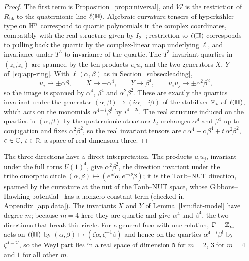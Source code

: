 \begin{proof}
The first term is Proposition~\ref{prop:universal}, and $\mathcal W$ is the restriction of $R_{\mathrm{hk}}$ to the
quaternionic line $\ell(\mathbb H)$. Algebraic curvature tensors of hyperk\"ahler type on $\mathbb H^n$
correspond to quartic polynomials in the complex coordinates, compatibly with the real structure given
by $I_2$~\cite{Alekseevsky:1968,Salamon:1982}; restriction to $\ell(\mathbb H)$ corresponds to pulling back the quartic by the
complex-linear map underlying $\ell$, and invariance under $T^3$ to invariance of the quartic. The
$T^3$-invariant quartics in $(z_i,\tilde z_i)$ are spanned by the ten products $u_iu_j$ and the two
generators $X$, $Y$ of~\eqref{eq:app-ring}. With $\ell(\alpha,\beta)$ as in Section~\ref{subsec:leading},
\[
 u_i\mapsto\pm\alpha\beta,\qquad X\mapsto-\alpha^4,\qquad Y\mapsto\beta^4,\qquad u_iu_j\mapsto\pm\alpha^2\beta^2,
\]
so the image is spanned by $\alpha^4$, $\beta^4$ and $\alpha^2\beta^2$. These are exactly the quartics
invariant under the generator $(\alpha,\beta)\mapsto(i\alpha,-i\beta)$ of the stabiliser $\mathbb Z_4$ of
$\ell(\mathbb H)$, which acts on the monomials $\alpha^{4-l}\beta^l$ by $i^{4-2l}$. The real structure induced on the quartics in $(\alpha,\beta)$ by the quaternionic structure $I_2$
exchanges $\alpha^4$ and $\beta^4$ up to conjugation and fixes $\alpha^2\beta^2$, so the real invariant tensors are
$c\,\alpha^4+\bar c\,\beta^4+t\,\alpha^2\beta^2$, $c\in\mathbb C$, $t\in\mathbb R$, a space of real dimension three.
\end{proof}

The three directions have a direct interpretation. The products $u_iu_j$, invariant under the full torus
$U(1)^4$, give $\alpha^2\beta^2$, the direction invariant under the triholomorphic circle
$(\alpha,\beta)\mapsto(e^{i\theta}\alpha,e^{-i\theta}\beta)$; it is the Taub--NUT direction, spanned by the curvature at
the nut of the Taub--NUT space, whose Gibbons--Hawking potential~\cite{GibbonsHawking:1978} has a nonzero
constant term (checked in Appendix~\ref{app:data}). The invariants $X$ and $Y$ of Lemma~\ref{lem:flat-model} have degree
$m$; because $m=4$ here they are quartic and give $\alpha^4$ and $\beta^4$, the two directions that break this
circle. For a general face with one relation, $\Gamma=\mathbb Z_m$ acts on $\ell(\mathbb H)$ by
$(\alpha,\beta)\mapsto(\zeta\alpha,\zeta^{-1}\beta)$ and hence on the quartics $\alpha^{4-l}\beta^l$ by $\zeta^{4-2l}$, so the Weyl part lies in
a real space of dimension $5$ for $m=2$, $3$ for $m=4$ and $1$ for all other $m$.

